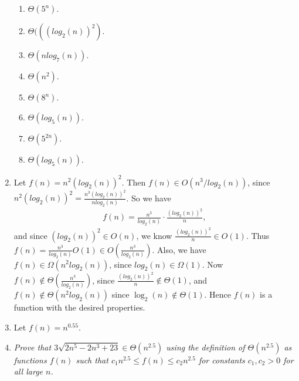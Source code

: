 \documentclass[10pt,oneside,reqno]{amsart}
\theoremstyle{plain}
\theoremstyle{definition}
\begin{document}
\begin{enumerate}[label=\arabic*.]
\begin{enumerate}
\item $\Theta (5^n)$. 

\item $\Theta (((log_2(n))^2)$. 

\item $\Theta (nlog_7(n))$. 

\item $\Theta (n^2)$. 

\item $\Theta (8^n)$. 

\item $\Theta (log_5(n))$. 

\item $\Theta (5^{2n})$. 

\item $\Theta (log_5(n))$. \\

\end{enumerate}

\item Let $f(n) = n^2(log_2(n))^2$. Then $f(n) \in O(n^3/log_2(n))$, since $n^2(log_2(n))^2 = \frac{n^3 (log_2(n))^2}{nlog_2(n)}$. So we have
\begin{equation}
\begin{aligned}
f(n) = \frac{n^3}{log_2(n)} \cdot \frac{(log_2(n))^2}{n},
\end{aligned}
\end{equation}
and since $(log_2(n))^2 \in O(n)$, we know $\frac{(log_2(n))^2}{n} \in O(1)$. Thus $f(n) = \frac{n^3}{log_2(n)} O(1) \in O( \frac{n^3}{log_2(n)})$. Also, we  have $f(n) \in \Omega(n^2log_2(n))$, since $log_2(n) \in \Omega(1)$. Now $f(n) \notin \Theta(\frac{n^3}{log_2(n)})$, since $\frac{(log_2(n))^2}{n} \notin \Theta(1)$, and $f(n) \notin \Theta(n^2 log_2(n))$ since $\log_2(n) \notin \Theta(1)$. Hence $f(n)$ is a function with the desired properties. \\

\item Let $f(n) = n^{0.55}$. \\

\item \textit{Prove that $3\sqrt{2n^5 - 2n^3 + 23} \in \Theta(n^{2.5})$ using the definition of $\Theta(n^{2.5})$ as functions $f(n)$ such that $c_1n^{2.5} \leq f(n) \leq c_2n^{2.5}$ for constants $c_1,c_2 > 0$ for all large $n$. }


\end{enumerate}
\end{document}
